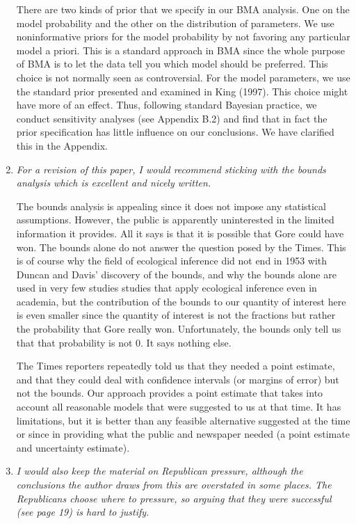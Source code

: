\documentclass[11pt]{article}
\begin{document}
\begin{enumerate}
  There are two kinds of prior that we specify in our BMA analysis.
  One on the model probability and the other on the distribution of
  parameters. We use noninformative priors for the model probability
  by not favoring any particular model a priori. This is a standard
  approach in BMA since the whole purpose of BMA is to let the data
  tell you which model should be preferred.  This choice is not
  normally seen as controversial. For the model parameters, we use the
  standard prior presented and examined in King (1997). This choice
  might have more of an effect.  Thus, following standard Bayesian
  practice, we conduct sensitivity analyses (see Appendix B.2) and
  find that in fact the prior specification has little influence on
  our conclusions.  We have clarified this in the Appendix.
  
\item {\it For a revision of this paper, I would recommend sticking
    with the bounds analysis which is excellent and nicely written.}
  
  The bounds analysis is appealing since it does not impose any
  statistical assumptions.  However, the public is apparently
  uninterested in the limited information it provides.  All it says is
  that it is possible that Gore could have won.  The bounds alone do
  not answer the question posed by the Times.  This is of course why
  the field of ecological inference did not end in 1953 with Duncan
  and Davis' discovery of the bounds, and why the bounds alone are
  used in very few studies studies that apply ecological inference
  even in academia, but the contribution of the bounds to our quantity
  of interest here is even smaller since the quantity of interest is
  not the fractions but rather the probability that Gore really won.
  Unfortunately, the bounds only tell us that that probability is not
  0.  It says nothing else.
  
  The Times reporters repeatedly told us that they needed a point
  estimate, and that they could deal with confidence intervals (or
  margins of error) but not the bounds.  Our approach provides a point
  estimate that takes into account all reasonable models that were
  suggested to us at that time.  It has limitations, but it is better
  than any feasible alternative suggested at the time or since in
  providing what the public and newspaper needed (a point estimate and
  uncertainty estimate).
 
\item {\it I would also keep the material on Republican pressure,
    although the conclusions the author draws from this are overstated
    in some places.  The Republicans choose where to pressure, so
    arguing that they were successful (see page 19) is hard to
    justify.}
  

\end{enumerate}
\end{document}
